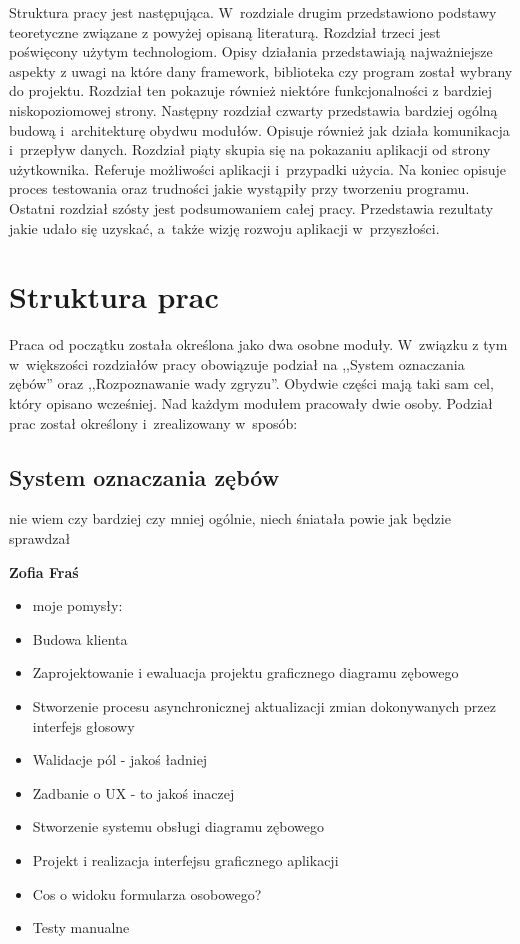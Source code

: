 Struktura pracy jest następująca. W~rozdziale drugim przedstawiono podstawy teoretyczne związane z powyżej opisaną literaturą. Rozdział trzeci jest poświęcony użytym technologiom. Opisy działania przedstawiają najważniejsze aspekty z uwagi na które dany framework, biblioteka czy program został wybrany do projektu. Rozdział ten pokazuje również niektóre funkcjonalności z bardziej niskopoziomowej strony. Następny rozdział czwarty przedstawia bardziej ogólną budową i~architekturę obydwu modułów. Opisuje również jak działa komunikacja i~przepływ danych. Rozdział piąty skupia się na pokazaniu aplikacji od strony użytkownika. Referuje możliwości aplikacji i~przypadki użycia. Na koniec opisuje proces testowania oraz trudności jakie wystąpiły przy tworzeniu programu. Ostatni rozdział szósty jest podsumowaniem całej pracy. Przedstawia rezultaty jakie udało się uzyskać, a~także wizję rozwoju aplikacji w~przyszłości.


\section{Struktura prac}
Praca od początku została określona jako dwa osobne moduły. W~związku z tym w~większości rozdziałów pracy obowiązuje podział na ,,System oznaczania zębów'' oraz ,,Rozpoznawanie wady zgryzu''. Obydwie części mają taki sam cel, który opisano wcześniej. Nad każdym modułem pracowały dwie osoby. Podział prac został określony i~zrealizowany w~sposób:
\subsection{System oznaczania zębów}
nie wiem czy bardziej czy mniej ogólnie, niech śniatała powie jak będzie sprawdzał


\textbf{Zofia Fraś}
\begin{itemize}
    \item moje pomysły:
    \item Budowa klienta
    \item Zaprojektowanie i ewaluacja projektu graficznego diagramu zębowego
    \item Stworzenie procesu asynchronicznej aktualizacji zmian dokonywanych przez interfejs głosowy
    \item Walidacje pól - jakoś ładniej
    \item Zadbanie o UX - to jakoś inaczej
    \item Stworzenie systemu obsługi diagramu zębowego
    \item Projekt i realizacja interfejsu graficznego aplikacji
    \item Cos o widoku formularza osobowego?
    \item Testy manualne 
\end{itemize}

